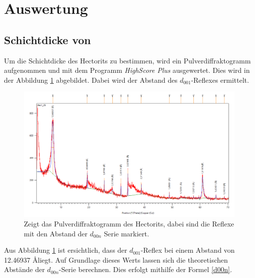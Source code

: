 \documentclass[12pt, a4paper]{article}
\begin{document}
\newpage
\section{Auswertung}
\subsection{\texorpdfstring{Schichtdicke von }{Schichtdicke von Na0.5·nH2O(Zn2.5Li0.5)(Si4O10)F2}}
Um die Schichtdicke des Hectorits zu bestimmen, wird ein Pulverdiffraktogramm aufgenommen und mit dem Programm \textit{HighScore Plus} ausgewertet. Dies wird in der Abbildung \ref{Hec1} abgebildet. Dabei wird der Abstand des $d_{001}$-Reflexes ermittelt.

\begin{figure}[!h]
  \includegraphics[scale=0.5]{Hec1.png}
  \caption{Zeigt das Pulverdiffraktogramm des Hectorits, dabei sind die Reflexe mit den Abstand der $d_{00n}$ Serie markiert.}
  \label{Hec1}
\end{figure}
\noindent
Aus Abbildung \ref{Hec1} ist ersichtlich, dass der $d_{001}$-Reflex bei einem Abstand von 12.46937 \AA liegt. 
Auf Grundlage dieses Werts lassen sich die theoretischen Abstände der $d_{00n}$-Serie berechnen. Dies erfolgt mithilfe der Formel \ref{d00n}.
\end{document}
